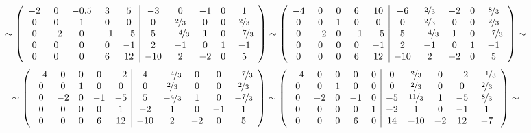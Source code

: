 \documentclass{article}
\begin{document}
$$\left.\sim \left(\begin{array}{ccccc|ccccc}
-2 & 0 & -0.5 & 3 & 5 & -3 & 0 & -1 & 0 & 1\\
0 & 0 & 1 & 0 & 0 & 0 & \nicefrac{2}{3} & 0 & 0 & \nicefrac{2}{3}\\
0 & -2 & 0 & -1 & -5 & 5 & -\nicefrac{4}{3} & 1 & 0 & -\nicefrac{7}{3}\\
0 & 0 & 0 & 0 & -1 & 2 & -1 & 0 & 1 & -1\\
0 & 0 & 0 & 6 & 12 & -10 & 2 & -2 & 0 & 5
\end{array}\right)\sim \left(\begin{array}{ccccc|ccccc}
-4 & 0 & 0 & 6 & 10 & -6 & \nicefrac{2}{3} & -2 & 0 & \nicefrac{8}{3}\\
0 & 0 & 1 & 0 & 0 & 0 & \nicefrac{2}{3} & 0 & 0 & \nicefrac{2}{3}\\
0 & -2 & 0 & -1 & -5 & 5 & -\nicefrac{4}{3} & 1 & 0 & -\nicefrac{7}{3}\\
0 & 0 & 0 & 0 & -1 & 2 & -1 & 0 & 1 & -1\\
0 & 0 & 0 & 6 & 12 & -10 & 2 & -2 & 0 & 5
\end{array}\right) \sim\right.$$
$$\left.\sim \left(\begin{array}{ccccc|ccccc}
-4 & 0 & 0 & 0 & -2 & 4 & -\nicefrac{4}{3} & 0 & 0 & -\nicefrac{7}{3}\\
0 & 0 & 1 & 0 & 0 & 0 & \nicefrac{2}{3} & 0 & 0 & \nicefrac{2}{3}\\
0 & -2 & 0 & -1 & -5 & 5 & -\nicefrac{4}{3} & 1 & 0 & -\nicefrac{7}{3}\\
0 & 0 & 0 & 0 & 1 & -2 & 1 & 0 & -1 & 1\\
0 & 0 & 0 & 6 & 12 & -10 & 2 & -2 & 0 & 5
\end{array}\right)\sim \left(\begin{array}{ccccc|ccccc}
-4 & 0 & 0 & 0 & 0 & 0 & \nicefrac{2}{3} & 0 & -2 & -\nicefrac{1}{3}\\
0 & 0 & 1 & 0 & 0 & 0 & \nicefrac{2}{3} & 0 & 0 & \nicefrac{2}{3}\\
0 & -2 & 0 & -1 & 0 & -5 & \nicefrac{11}{3} & 1 & -5 & \nicefrac{8}{3}\\
0 & 0 & 0 & 0 & 1 & -2 & 1 & 0 & -1 & 1\\
0 & 0 & 0 & 6 & 0 & 14 & -10 & -2 & 12 & -7
\end{array}\right)\sim \right.$$
\end{document}
